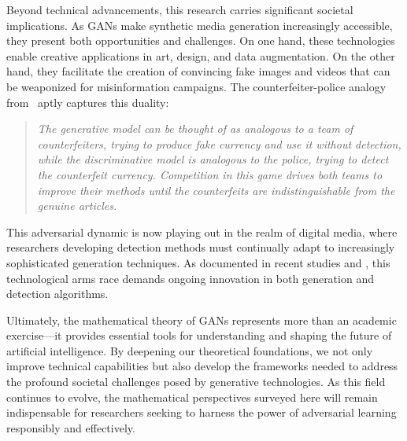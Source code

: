 Beyond technical advancements, this research carries significant societal implications. As GANs make synthetic media generation increasingly accessible, they present both opportunities and challenges. On one hand, these technologies enable creative applications in art, design, and data augmentation. On the other hand, they facilitate the creation of convincing fake images and videos that can be weaponized for misinformation campaigns. The counterfeiter-police analogy from~\cite{ref:goodfellow-original} aptly captures this duality:
\begin{quote}
	\itshape The generative model can be thought of as analogous to a team of counterfeiters, trying to produce fake currency and use it without detection, while the discriminative model is analogous to the police, trying to detect the counterfeit currency. Competition in this game drives both teams to improve their methods until the counterfeits are indistinguishable from the genuine articles.
\end{quote}

This adversarial dynamic is now playing out in the realm of digital media, where researchers developing detection methods must continually adapt to increasingly sophisticated generation techniques. As documented in recent studies  \cite{ref:df11} and \cite{ref:df12}, this technological arms race demands ongoing innovation in both generation and detection algorithms.

Ultimately, the mathematical theory of GANs represents more than an academic exercise—it provides essential tools for understanding and shaping the future of artificial intelligence. By deepening our theoretical foundations, we not only improve technical capabilities but also develop the frameworks needed to address the profound societal challenges posed by generative technologies. As this field continues to evolve, the mathematical perspectives surveyed here will remain indispensable for researchers seeking to harness the power of adversarial learning responsibly and effectively.

